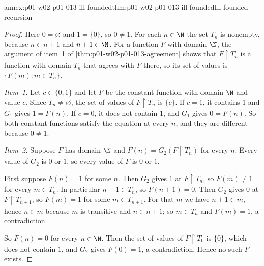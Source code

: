 \begin{annexitem}{annex:p01-w02-p01-013-ill-founded}{thm:p01-w02-p01-013-ill-founded}{Ill-founded recursion}
\begin{proof}
Here \(0=\varnothing\) and \(1=\{0\}\), so \(0\ne1\). For each \(n\in\N\)
the set \(T_n\) is nonempty, because \(n\in n+1\) and \(n+1\in\N\).
For a function \(F\) with domain \(\N\), the argument of item~1 of
\cref{thm:p01-w02-p01-013-agreement} shows that
\(F\mathbin{\upharpoonright}T_n\) is a function with domain \(T_n\) that
agrees with \(F\) there, so its set of values is \(\{F(m):m\in T_n\}\).

\emph{Item~1.} Let \(c\in\{0,1\}\) and let \(F\) be the constant function
with domain \(\N\) and value \(c\). Since \(T_n\ne\varnothing\), the set of
values of \(F\mathbin{\upharpoonright}T_n\) is \(\{c\}\). If \(c=1\), it
contains \(1\) and \(G_1\) gives \(1=F(n)\). If \(c=0\), it does not contain
\(1\), and \(G_1\) gives \(0=F(n)\). So both constant functions satisfy the
equation at every \(n\), and they are different because \(0\ne1\).

\emph{Item~2.} Suppose \(F\) has domain \(\N\) and
\(F(n)=G_2(F\mathbin{\upharpoonright}T_n)\) for every \(n\). Every value of
\(G_2\) is \(0\) or \(1\), so every value of \(F\) is \(0\) or \(1\).

First suppose \(F(n)=1\) for some \(n\). Then \(G_2\) gives \(1\) at
\(F\mathbin{\upharpoonright}T_n\), so \(F(m)\ne1\) for every \(m\in T_n\).
In particular \(n+1\in T_n\), so \(F(n+1)=0\). Then \(G_2\) gives \(0\) at
\(F\mathbin{\upharpoonright}T_{n+1}\), so \(F(m)=1\) for some \(m\in T_{n+1}\).
For that \(m\) we have \(n+1\in m\), hence \(n\in m\) because \(m\) is
transitive and \(n\in n+1\); so \(m\in T_n\) and \(F(m)=1\), a
contradiction.

So \(F(n)=0\) for every \(n\in\N\). Then the set of values of
\(F\mathbin{\upharpoonright}T_0\) is \(\{0\}\), which does not contain
\(1\), and \(G_2\) gives \(F(0)=1\), a contradiction. Hence no such \(F\)
exists.
\end{proof}
\end{annexitem}
